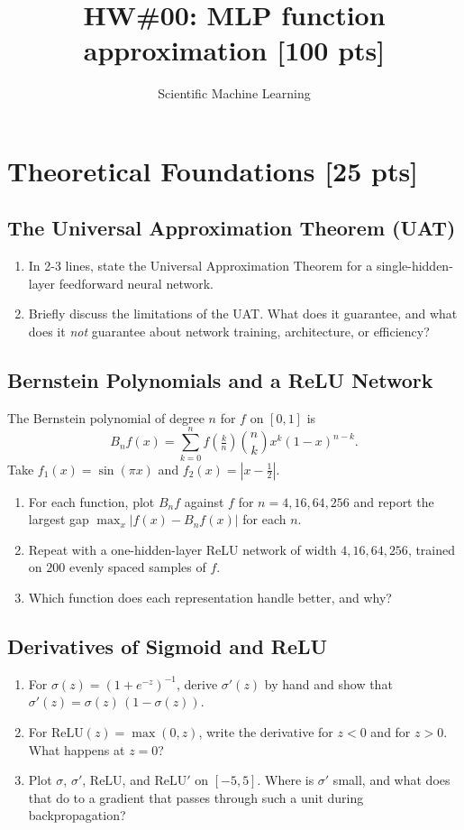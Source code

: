 \documentclass[11pt]{article}
\title{\textbf{HW\#00: MLP function approximation [100 pts]}}
\author{Scientific Machine Learning}
\date{}
\begin{document}
\maketitle
\hrulefill

\section{Theoretical Foundations [25 pts]}

\subsection{The Universal Approximation Theorem (UAT)}
\begin{enumerate}
    \item[\textbf{a)}] In 2-3 lines, state the Universal Approximation Theorem for a single-hidden-layer feedforward neural network.
    \item[\textbf{b)}] Briefly discuss the limitations of the UAT. What does it guarantee, and what does it \textit{not} guarantee about network training, architecture, or efficiency?
\end{enumerate}

\subsection{Bernstein Polynomials and a ReLU Network}
The Bernstein polynomial of degree $n$ for $f$ on $[0,1]$ is
\[ B_n f(x) = \sum_{k=0}^{n} f\!\left(\tfrac{k}{n}\right) \binom{n}{k} x^k (1-x)^{n-k}. \]
Take $f_1(x) = \sin(\pi x)$ and $f_2(x) = |x - \tfrac12|$.
\begin{enumerate}
    \item[\textbf{a)}] For each function, plot $B_n f$ against $f$ for $n = 4, 16, 64, 256$ and report the largest gap $\max_x |f(x) - B_n f(x)|$ for each $n$.
    \item[\textbf{b)}] Repeat with a one-hidden-layer ReLU network of width $4, 16, 64, 256$, trained on $200$ evenly spaced samples of $f$.
    \item[\textbf{c)}] Which function does each representation handle better, and why?
\end{enumerate}

\subsection{Derivatives of Sigmoid and ReLU}
\begin{enumerate}
    \item[\textbf{a)}] For $\sigma(z) = (1 + e^{-z})^{-1}$, derive $\sigma'(z)$ by hand and show that $\sigma'(z) = \sigma(z)\,(1 - \sigma(z))$.
    \item[\textbf{b)}] For $\mathrm{ReLU}(z) = \max(0, z)$, write the derivative for $z < 0$ and for $z > 0$. What happens at $z = 0$?
    \item[\textbf{c)}] Plot $\sigma$, $\sigma'$, $\mathrm{ReLU}$, and $\mathrm{ReLU}'$ on $[-5, 5]$. Where is $\sigma'$ small, and what does that do to a gradient that passes through such a unit during backpropagation?
\end{enumerate}
\end{document}
